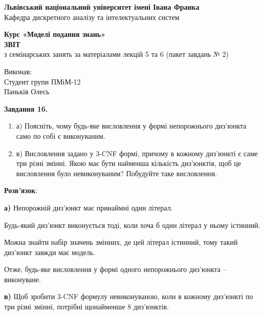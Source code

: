 \documentclass[a4paper,14pt]{extarticle} %
\begin{document}
\thispagestyle{empty}

\begin{center}
    \textbf{Львівський національний університет імені Івана Франка}\\[1ex]
    Кафедра дискретного аналізу та інтелектуальних систем
\end{center}

\vspace{5cm} %

\begin{center}
    \Large\textbf{Курс «Моделі подання знань»}\\[4ex]
    \huge\textbf{ЗВІТ}\\[3ex]
    \Large з семінарських занять за матеріалами лекцій 5 та 6 (пакет завдань № 2)
\end{center}

\vspace{2cm}
\begin{flushright}
    Виконав:\\
    Студент групи ПМіМ-12\\
    Паньків Олесь
\end{flushright}


\newpage
\pagestyle{plain}

\textbf{Завдання 16.}
\begin{enumerate}[label=]
    \item а) Поясніть, чому будь-яке висловлення у формі непорожнього диз’юнкта
        само по собі є виконуваним.
    \item в) Висловлення задано у 3-CNF формі, причому в кожному диз’юнкті є саме
        три різні змінні. Якою має бути найменша кількість диз’юнктів, щоб це
        висловлення було невиконуваним? Побудуйте таке висловлення.
\end{enumerate}

\textbf{Розв'язок}:

\textbf{а)} Непорожній диз’юнкт має принаймні один літерал.

Будь-який диз’юнкт виконується тоді, коли хоча б один літерал у ньому істинний.

Можна знайти набір значень змінних, де цей літерал істинний, тому такий диз’юнкт
завжди має модель.

Отже, будь-яке висловлення у формі одного непорожнього диз’юнкта – виконуване.

\textbf{в)} Щоб зробити 3-CNF формулу невиконуваною, коли в кожному диз’юнкті по
три різні змінні, потрібні щонайменше 8 диз’юнктів.
\end{document}
